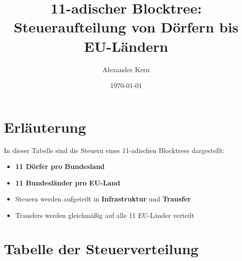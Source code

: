 \documentclass[a4paper,12pt]{article}
\title{11-adischer Blocktree: Steueraufteilung von Dörfern bis EU-Ländern}
\author{Alexander Kern}
\date{\today}
\begin{document}
\maketitle

\section{Erläuterung}

In dieser Tabelle sind die Steuern eines 11-adischen Blocktrees dargestellt:

\begin{itemize}
\item \textbf{11 Dörfer pro Bundesland}  
\item \textbf{11 Bundesländer pro EU-Land}  
\item Steuern werden aufgeteilt in \textbf{Infrastruktur} und \textbf{Transfer}  
\item Transfers werden gleichmäßig auf alle 11 EU-Länder verteilt  
\end{itemize}

\section{Tabelle der Steuerverteilung}

\renewcommand{\arraystretch}{1.2} %
\setlength{\tabcolsep}{4pt} %
\end{document}
